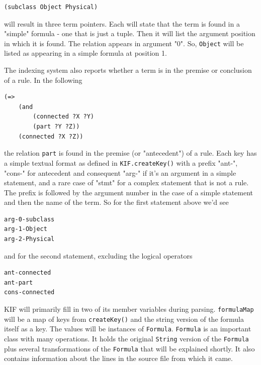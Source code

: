 \documentclass{book}
\begin{document}
\begin{lstlisting}[basicstyle=\ttfamily\small\bfseries]
(subclass Object Physical)
\end{lstlisting}

will result in three term pointers.  Each will state that the term is found
in a "simple" formula - one that is just a tuple.  Then it will list the argument
position in which it is found.  The relation appears in argument "0".  So,
\texttt{Object} will be listed as appearing in a simple formula at position 1.

The indexing system also reports whether a term is in the premise or conclusion of
a rule.  In the following

\begin{lstlisting}[basicstyle=\ttfamily\small\bfseries]
(=>
    (and
        (connected ?X ?Y)
        (part ?Y ?Z))
    (connected ?X ?Z))
\end{lstlisting}

the relation \texttt{part} is found in the premise (or "antecedent") of a rule. Each key
has a simple textual format as defined in \texttt{KIF.createKey()} with a prefix
"ant-", "cons-" for antecedent and consequent "arg-" if it's an argument in a simple
statement, and a rare case of "stmt" for a complex statement that is not a rule.
The prefix is followed by the argument number in the case of a simple statement and
then the name of the term.  So for the first statement above we'd see

\begin{lstlisting}[basicstyle=\ttfamily\small\bfseries]
arg-0-subclass 
arg-1-Object 
arg-2-Physical
\end{lstlisting}

and for the second statement, excluding the logical operators

\begin{lstlisting}[basicstyle=\ttfamily\small\bfseries]
ant-connected
ant-part
cons-connected
\end{lstlisting}

\begin{sloppypar}
KIF will primarily fill in two of its member variables during parsing.  \texttt{formulaMap}
will be a map of keys from \texttt{createKey()} and the string version of the formula itself
as a key.  The values will be instances of \texttt{Formula}.  \texttt{Formula} is an important
class with many operations.  It holds the original \texttt{String} version of the \texttt{Formula}
plus several transformations of the \texttt{Formula} that will be explained shortly.  It also
contains information about the lines in the source file from which it came.
\end{sloppypar}
\end{document}
